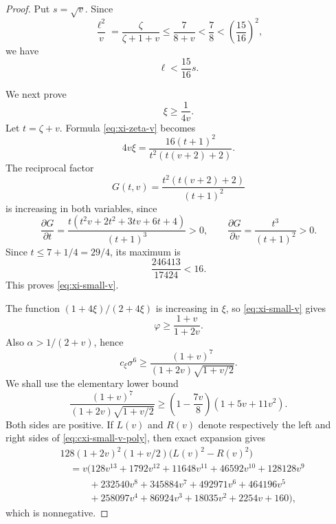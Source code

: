 \documentclass[11pt]{article}
\begin{document}
\begin{proof}
Put \(s=\sqrt v\).  Since
\[
       \frac{\ell^2}{v}=\frac{\zeta}{\zeta+1+v}
       \le\frac7{8+v}<\frac78<\left(\frac{15}{16}\right)^2,
\]
we have
\begin{equation}\label{eq:ell-small-v}
       \ell<\frac{15}{16}s.
\end{equation}

We next prove
\begin{equation}\label{eq:xi-small-v}
       \xi\ge\frac1{4v}.
\end{equation}
Let \(t=\zeta+v\).  Formula \eqref{eq:xi-zeta-v} becomes
\[
       4v\xi=
       \frac{16(t+1)^2}{t^2(t(v+2)+2)}.
\]
The reciprocal factor
\[
       G(t,v)=\frac{t^2(t(v+2)+2)}{(t+1)^2}
\]
is increasing in both variables, since
\[
 \frac{\partial G}{\partial t}
 =\frac{t(t^2v+2t^2+3tv+6t+4)}{(t+1)^3}>0,
 \qquad
 \frac{\partial G}{\partial v}=\frac{t^3}{(t+1)^2}>0.
\]
Since
\(t\le7+1/4=29/4\), its maximum is
\[
       \frac{246413}{17424}<16.
\]
This proves \eqref{eq:xi-small-v}.

The function \((1+4\xi)/(2+4\xi)\) is increasing in \(\xi\), so
\eqref{eq:xi-small-v} gives
\[
       \varphi\ge\frac{1+v}{1+2v}.
\]
Also \(\alpha>1/(2+v)\), hence
\[
 c_\xi\sigma^6
 \ge\frac{(1+v)^7}{(1+2v)\sqrt{1+v/2}}.
\]
We shall use the elementary lower bound
\begin{equation}\label{eq:cxi-small-v-poly}
 \frac{(1+v)^7}{(1+2v)\sqrt{1+v/2}}
 \ge\left(1-\frac{7v}{8}\right)(1+5v+11v^2).
\end{equation}
Both sides are positive.  If \(L(v)\) and \(R(v)\) denote respectively
the left and right sides of \eqref{eq:cxi-small-v-poly}, then exact
expansion gives
\begin{equation}\label{eq:small-v-square-diff}
\begin{aligned}
 &128(1+2v)^2(1+v/2)\bigl(L(v)^2-R(v)^2\bigr)\\
 &\quad=v\bigl(128v^{13}+1792v^{12}+11648v^{11}+46592v^{10}
 +128128v^9\\
 &\qquad\quad+232540v^8+345884v^7+492971v^6+464196v^5\\
 &\qquad\quad+258097v^4+86924v^3+18035v^2+2254v+160\bigr),
\end{aligned}
\end{equation}
which is nonnegative.


\end{proof}
\end{document}
